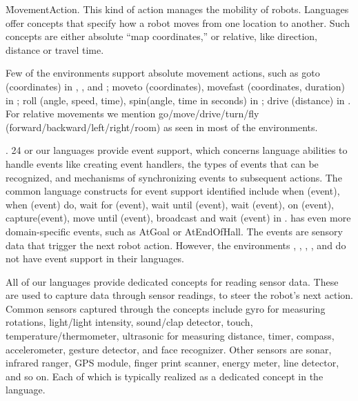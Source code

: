 \f{MovementAction}. This kind of action manages the mobility of robots. Languages offer concepts that specify how a robot moves from one location to another. Such  concepts are either absolute ``map coordinates,'' or relative, like direction, distance or travel time.

Few of the environments support absolute movement actions, such as goto (coordinates) in \flyaq, \missionlab, and \makeblock; moveto (coordinates), movefast (coordinates, duration) in \tivipe; roll (angle, speed, time), spin(angle, time in seconds) in \sphero; drive (distance) in \codelab. For relative movements we mention go/move/drive/turn/fly (forward/backward/left/right/room) as seen in most of the environments. %






 




\parhead{\fevents}. 24 or our languages provide event support, which concerns language abilities to handle events like creating event handlers, the types of events that can be recognized, and mechanisms of synchronizing events to subsequent actions. The common language constructs for event support identified include when (event), when (event) do, wait for (event), wait until (event), wait (event), on (event), capture(event), move until (event), broadcast and wait (event) in \vex. \missionlab has even more domain-specific events, such as AtGoal or AtEndOfHall. 
The events are sensory data that trigger the next robot action. However, the environments \arcbotics, \tivipe, \minibloq, \turtlebot, and \robotc do not have event support in their languages.

 All of our languages provide dedicated concepts for reading sensor data. These are used to capture data through sensor readings, to steer the robot's next action. 
Common sensors captured through the concepts  include gyro for measuring rotations, light/light intensity, sound/clap detector, touch, temperature/thermometer, ultrasonic for measuring distance, timer, compass, accelerometer, gesture detector, and face recognizer. Other sensors are sonar, infrared ranger, GPS module, finger print scanner, energy meter, line detector, and so on. Each of which is typically realized as a dedicated concept in the language.

